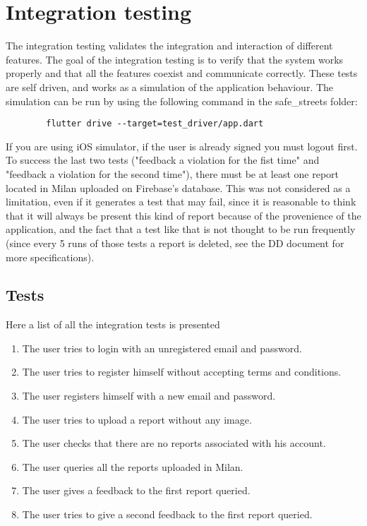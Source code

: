 \documentclass[../ITD.tex]{subfiles}
\begin{document}
    \section{Integration testing}\label{sec:integration-testing}
    The integration testing validates the integration and interaction of different features.
    The goal of the integration testing is to verify that the system works properly and that all the features coexist and communicate correctly.
    These tests are self driven, and works as a simulation of the application behaviour.
    The simulation can be run by using the following command in the safe\_streets folder:
    \begin{verbatim}
        flutter drive --target=test_driver/app.dart
    \end{verbatim}
    If you are using iOS simulator, if the user is already signed you must logout first.
    To success the last two tests ("feedback a violation for the fist time" and "feedback a violation for the second time"),
    there must be at least one report located in Milan uploaded on Firebase's database.
    This was not considered as a limitation, even if it generates a test that may fail, since it is reasonable to think that it will always be present
    this kind of report because of the provenience of the application, and the fact that a test like that is not thought to be run frequently
    (since every 5 runs of those tests a report is deleted, see the DD document for more specifications).
    \subsection{Tests}\label{subsec:tests}
    Here a list of all the integration tests is presented
    \begin{enumerate}
        \item The user tries to login with an unregistered email and password.
        \item The user tries to register himself without accepting terms and conditions.
        \item The user registers himself with a new email and password.
        \item The user tries to upload a report without any image.
        \item The user checks that there are no reports associated with his account.
        \item The user queries all the reports uploaded in Milan.
        \item The user gives a feedback to the first report queried.
        \item The user tries to give a second feedback to the first report queried.
    \end{enumerate}
\end{document}
